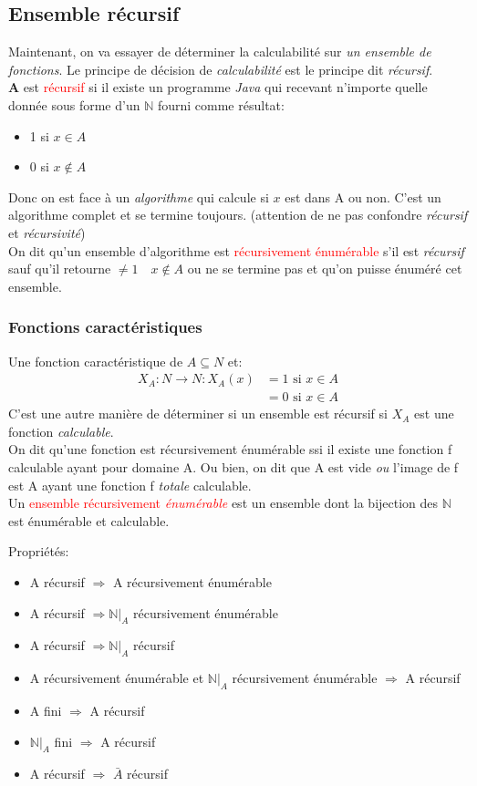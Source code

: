 \documentclass{report}
\begin{document}
\subsection{Ensemble récursif}
Maintenant, on va essayer de déterminer la calculabilité sur \textit{un ensemble de fonctions}.
Le principe de décision de \textit{calculabilité} est le principe dit \textit{récursif}.\\
\textbf{A} est \textcolor{red}{récursif} si il existe un programme \textit{Java} qui recevant n'importe quelle donnée sous forme d'un $\mathbb{N}$ fourni comme résultat:
\begin{itemize}
\item 1 si $x \in A$
\item 0 si $x \notin A$
\end{itemize}
Donc on est face à un \textit{algorithme} qui calcule si $x$ est dans A ou non. C'est un algorithme complet et se termine toujours. (attention de ne pas confondre \textit{récursif} et \textit{récursivité})\\

On dit qu'un ensemble d'algorithme est \textcolor{red}{récursivement énumérable} s'il est \textit{récursif} sauf qu'il retourne $\neq 1 \quad x \notin A$ ou ne se termine pas et qu'on puisse énuméré cet ensemble.

\subsubsection{Fonctions caractéristiques} \label{caract}
Une fonction caractéristique de $A \subseteq N$ et:
\begin{align}
X_A : N \rightarrow N : X_A(x) &= 1 \text{ si } x \in A\\
&= 0 \text{ si } x \in A
\end{align} 
C'est une autre manière de déterminer si un ensemble est récursif si $X_A$ est une fonction \textit{calculable}.\\
On dit qu'une fonction est récursivement énumérable ssi il existe une fonction f calculable ayant pour domaine A. Ou bien, on dit que A est vide \textit{ou} l'image de f est A ayant une fonction f \textit{totale} calculable.\\
Un \textcolor{red}{ensemble récursivement \textit{énumérable}} est un ensemble dont la bijection des $\mathbb{N}$ est énumérable et calculable.

Propriétés:
\begin{itemize}
\item A récursif $\Rightarrow$ A récursivement énumérable 
\item A récursif $\Rightarrow \mathbb{N}\vert_A$ récursivement énumérable 
\item A récursif $\Rightarrow \mathbb{N}\vert_A$ récursif 
\item A récursivement énumérable et $\mathbb{N}\vert_A$ récursivement énumérable $\Rightarrow$ A récursif 
\item A fini $\Rightarrow$ A récursif
\item $\mathbb{N}\vert_A$ fini $\Rightarrow$ A récursif
\item A récursif $\Rightarrow$ $\bar{A}$ récursif
\end{itemize}
\end{document}
